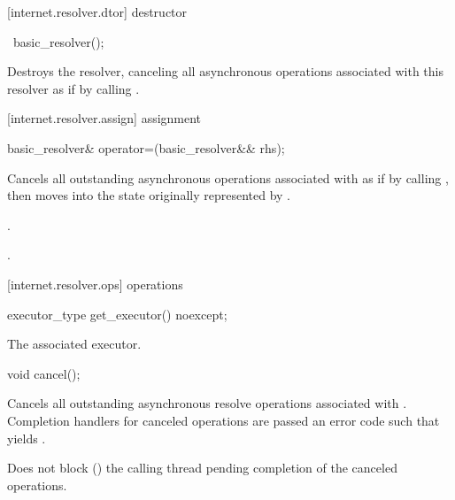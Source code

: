 [internet.resolver.dtor]{ destructor}

\begin{itemdecl}
~basic_resolver();
\end{itemdecl}

\begin{itemdescr}
\pnum
\effects Destroys the resolver, canceling all asynchronous operations associated with this resolver as if by calling .
\end{itemdescr}



[internet.resolver.assign]{ assignment}

\begin{itemdecl}
basic_resolver& operator=(basic_resolver&& rhs);
\end{itemdecl}

\begin{itemdescr}
\pnum
\effects Cancels all outstanding asynchronous operations associated with  as if by calling , then moves into  the state originally represented by .

\pnum
\postconditions {}.

\pnum
\returns {}.
\end{itemdescr}



[internet.resolver.ops]{ operations}

\begin{itemdecl}
executor_type get_executor() noexcept;
\end{itemdecl}

\begin{itemdescr}
\pnum
\returns The associated executor.
\end{itemdescr}

\begin{itemdecl}
void cancel();
\end{itemdecl}

\begin{itemdescr}
\pnum
\effects Cancels all outstanding asynchronous resolve operations associated with . Completion handlers for canceled operations are passed an error code  such that  yields .

\pnum
\remarks Does not block () the calling thread pending completion of the canceled operations.
\end{itemdescr}

